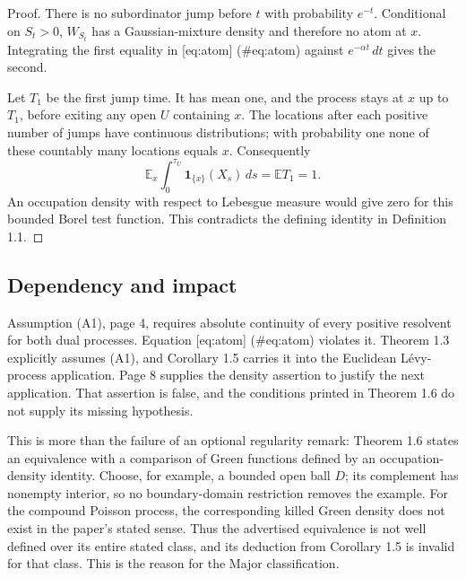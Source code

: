 \documentclass[10pt]{article}
\begin{document}
Proof. There is no subordinator jump before \(t\) with probability \(e^{-t}\). Conditional on \(S_t>0\), \(W_{S_t}\) has a Gaussian-mixture density and therefore no atom at \(x\). Integrating the first equality in [eq:atom] (\#eq:atom) against \(e^{-\alpha t}\,dt\) gives the second.\par
Let \(T_1\) be the first jump time. It has mean one, and the process stays at \(x\) up to \(T_1\), before exiting any open \(U\) containing \(x\). The locations after each positive number of jumps have continuous distributions; with probability one none of these countably many locations equals \(x\). Consequently \[\mathbb E_x\int_0^{\tau_U}\mathbf1_{\{x\}}(X_s)\,ds
   =\mathbb ET_1=1.\] An occupation density with respect to Lebesgue measure would give zero for this bounded Borel test function. This contradicts the defining identity in Definition 1.1. ◻\par
\subsection*{Dependency and impact}
Assumption (A1), page 4, requires absolute continuity of every positive resolvent for both dual processes. Equation [eq:atom] (\#eq:atom) violates it. Theorem 1.3 explicitly assumes (A1), and Corollary 1.5 carries it into the Euclidean Lévy-process application. Page 8 supplies the density assertion to justify the next application. That assertion is false, and the conditions printed in Theorem 1.6 do not supply its missing hypothesis.\par
This is more than the failure of an optional regularity remark: Theorem 1.6 states an equivalence with a comparison of Green functions defined by an occupation-density identity. Choose, for example, a bounded open ball \(D\); its complement has nonempty interior, so no boundary-domain restriction removes the example. For the compound Poisson process, the corresponding killed Green density does not exist in the paper’s stated sense. Thus the advertised equivalence is not well defined over its entire stated class, and its deduction from Corollary 1.5 is invalid for that class. This is the reason for the Major classification.\par
\end{document}
